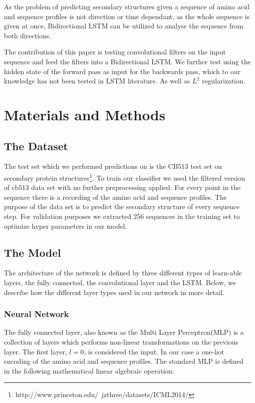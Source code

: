 \documentclass{article}
\begin{document}
As the problem of predicting secondary structures given a sequence of amino acid and sequence profiles is not direction or time dependant, as the whole sequence is given at once, Bidirectional LSTM can be utilized to analyse the sequence from both directions\cite{Schuster1997}.

The contribution of this paper is testing convolutional filters on the input sequence and feed the filters into a Bidirectional LSTM. We further test using the hidden state of the forward pass as input for the backwards pass, which to our knowledge has not been tested in LSTM literature. As well as $L^2$ regularization.
\section{Materials and Methods}
\subsection{The Dataset}
\label{ssec:thedataset}
The test set which we performed predictions on is the CB513 test set on secondary protein structures\footnote{http://www.princeton.edu/~jzthree/datasets/ICML2014/}. To train our classifier we used the filtered version of cb513 data set with no further preprocessing applied. For every point in the sequence there is a recording of the amino acid and sequence profiles. The purpose of the data set is to predict the secondary structure of every sequence step. For validation purposes we extracted 256 sequences in the training set to optimize hyper parameters in our model.
\subsection{The Model}
\label{sec:thecnnarchitecture}
The architecture of the network is defined by three different types of learn-able layers, the fully connected, the convolutional layer and the LSTM. Below, we describe how the different layer types used in our network in more detail.
\subsubsection{Neural Network}
\label{sssec:neuralnetwork}
The fully connected layer, also known as the Multi Layer Perceptron(MLP)\cite{ruck1990multilayer} is a collection of layers which performs non-linear transformations on the previous layer. The first layer, $l=0$, is considered the input. In our case a one-hot encoding of the amino acid and sequence profiles. The standard MLP is defined in the following mathematical linear algebraic operation:
\end{document}
